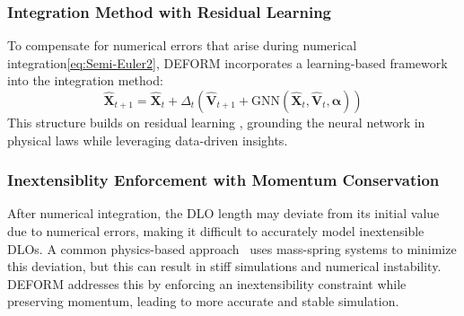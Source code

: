 \subsubsection{Integration Method with Residual Learning}
 To compensate for numerical errors that arise during numerical integration\eqref{eq:Semi-Euler2}, DEFORM incorporates a learning-based framework into the integration method: 
 \begin{equation}
                \hat{\textbf{X}}_{t+1} = \hat{\textbf{X}}_t + \Delta_t (\hat{\textbf{V}}_{t+1} + \text{GNN}(\hat{\textbf{X}}_t, \hat{\textbf{V}}_t, \bm{\alpha}))
       \label{eq:NN-Semi-Euler3}
 \end{equation}
This structure builds on residual learning \cite{resnet}, grounding the neural network in physical laws while leveraging data-driven insights. 

\subsubsection{Inextensiblity Enforcement with Momentum Conservation}
After numerical integration, the DLO length may deviate from its initial value due to numerical errors, making it difficult to accurately model inextensible DLOs. 
A common physics-based approach~\cite{LargeStepSimulation, diffcloth, Liu:2013:FSM} uses mass-spring systems to minimize this deviation, but this can result in stiff simulations and numerical instability. 
DEFORM addresses this by enforcing an inextensibility constraint while preserving momentum, leading to more accurate and stable simulation. 

